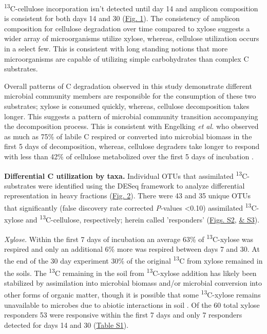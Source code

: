 \textsuperscript{13}C-cellulose incorporation isn't detected until day 14 and amplicon composition is consistent for both days 14 and 30 (\href{https://www.authorea.com/users/3537/articles/3612/master/file/figures/ordination_all1/ordination_all1.png}{Fig. 1}). The consistency of amplicon composition for cellulose degradation over time compared to xylose suggests a wider array of microorganisms utilize xylose, whereas, cellulose utilization occurs in a select few. This is consistent with long standing notions that more microorganisms are capable of utilizing simple carbohydrates than complex C substrates. 

Overall patterns of C degradation observed in this study demonstrate different microbial community members are responsible for the consumption of these two substrates; xylose is consumed quickly, whereas, cellulose decomposition takes longer. This suggests a pattern of microbial community transition accompanying the decomposition process. This is consistent with Engelking \textit{et al.}\cite{Engelking_2007} who observed as much as 75\% of labile C respired or converted into microbial biomass in the first 5 days of decomposition, whereas, cellulose degraders take longer to respond with less than 42\% of cellulose metabolized over the first 5 days of incubation \cite{Hu_1997}. 

\textbf{Differential C utilization by taxa.} Individual OTUs that assimilated \textsuperscript{13}C-substrates were identified using the DESeq framework \cite{Anders_Huber_2010} to analyze differential representation in heavy fractions (\href{https://www.authorea.com/users/3537/articles/3612/master/file/figures/l2fc_fig1/l2fc_fig.pdf}{Fig. 2}). There were 43 and 35 unique OTUs that significantly (false discovery rate corrected \textit{P}-values \textless 0.10) assimilated \textsuperscript{13}C-xylose and \textsuperscript{13}C-cellulose, respectively; herein called 'responders' (\href{https://www.authorea.com/users/3537/articles/8459/master/file/figures/OTU_screening_schematic/OTU_screening_schematic.pdf}{Figs. S2}, \href{https://www.authorea.com/users/3537/articles/8459/master/file/figures/l2fc_fig_pVal/l2fc_fig_pVal.png}{& S3}).

\textit{Xylose}. Within the first 7 days of incubation an average 63\% of \textsuperscript{13}C-xylose was respired and only an additional 6\% more was respired between days 7 and 30. At the end of the 30 day experiment 30\% of the original \textsuperscript{13}C from xylose remained in the soils. The \textsuperscript{13}C remaining in the soil from \textsuperscript{13}C-xylose addition has likely been stabilized by assimilation into microbial biomass and/or microbial conversion into other forms of organic matter, though it is possible that some \textsuperscript{13}C-xylose remains unavailable to microbes due to abiotic interactions in soil \cite{Kalbitz_2000}. Of the 60 total xylose responders 53 were responsive within the first 7 days and only 7 responders detected for days 14 and 30 (\href{https://authorea.com/users/3537/articles/8459/master/file/figures/resp_table/resp_table.png}{Table S1}). 

